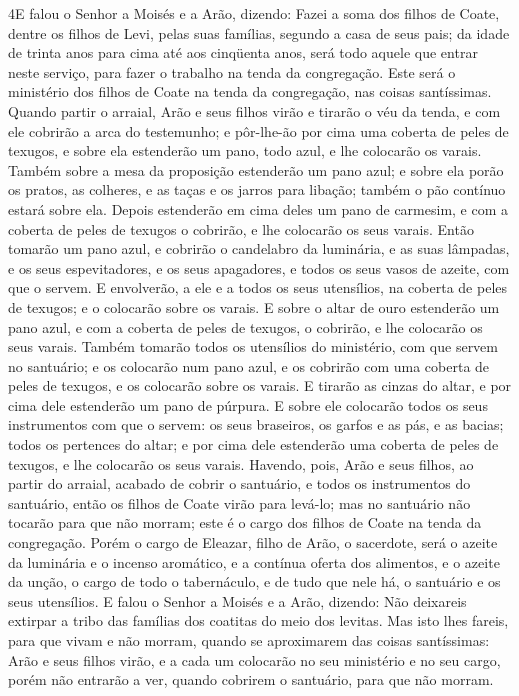 \lettrine{4} E falou o Senhor a Moisés e a Arão, dizendo:
Fazei a soma dos filhos de Coate, dentre os filhos de Levi,
pelas suas famílias, segundo a casa de seus pais; da idade de
trinta anos para cima até aos cinqüenta anos, será todo aquele que
entrar neste serviço, para fazer o trabalho na tenda da congregação.
Este será o ministério dos filhos de Coate na tenda da
congregação, nas coisas santíssimas. Quando partir o arraial,
Arão e seus filhos virão e tirarão o véu da tenda, e com ele
cobrirão a arca do testemunho; e pôr-lhe-ão por cima uma coberta
de peles de texugos, e sobre ela estenderão um pano, todo azul, e
lhe colocarão os varais. Também sobre a mesa da proposição
estenderão um pano azul; e sobre ela porão os pratos, as colheres, e
as taças e os jarros para libação; também o pão contínuo estará
sobre ela. Depois estenderão em cima deles um pano de carmesim,
e com a coberta de peles de texugos o cobrirão, e lhe colocarão os
seus varais. Então tomarão um pano azul, e cobrirão o candelabro
da luminária, e as suas lâmpadas, e os seus espevitadores, e os seus
apagadores, e todos os seus vasos de azeite, com que o servem.
E envolverão, a ele e a todos os seus utensílios, na coberta
de peles de texugos; e o colocarão sobre os varais. E sobre o
altar de ouro estenderão um pano azul, e com a coberta de peles de
texugos, o cobrirão, e lhe colocarão os seus varais. Também
tomarão todos os utensílios do ministério, com que servem no
santuário; e os colocarão num pano azul, e os cobrirão com uma
coberta de peles de texugos, e os colocarão sobre os varais.
E tirarão as cinzas do altar, e por cima dele estenderão um
pano de púrpura. E sobre ele colocarão todos os seus
instrumentos com que o servem: os seus braseiros, os garfos e as
pás, e as bacias; todos os pertences do altar; e por cima dele
estenderão uma coberta de peles de texugos, e lhe colocarão os seus
varais. Havendo, pois, Arão e seus filhos, ao partir do
arraial, acabado de cobrir o santuário, e todos os instrumentos do
santuário, então os filhos de Coate virão para levá-lo; mas no
santuário não tocarão para que não morram; este é o cargo dos filhos
de Coate na tenda da congregação. Porém o cargo de Eleazar,
filho de Arão, o sacerdote, será o azeite da luminária e o incenso
aromático, e a contínua oferta dos alimentos, e o azeite da unção, o
cargo de todo o tabernáculo, e de tudo que nele há, o santuário e os
seus utensílios. E falou o Senhor a Moisés e a Arão, dizendo:
Não deixareis extirpar a tribo das famílias dos coatitas do
meio dos levitas. Mas isto lhes fareis, para que vivam e não
morram, quando se aproximarem das coisas santíssimas: Arão e seus
filhos virão, e a cada um colocarão no seu ministério e no seu
cargo, porém não entrarão a ver, quando cobrirem o santuário,
para que não morram.


